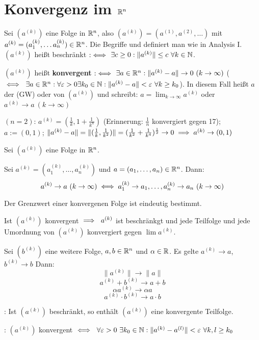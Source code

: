 \documentclass[a4paper,twoside,DIV15,BCOR12mm,chapterprefix=true,headings=twolinechapter]{scrbook}
\begin{document}
\chapter{Konvergenz im $\mathbb{R}^n$}

Sei $(a^{(k)})$ eine Folge in $\mathbb{R}^n$, also $(a^{(k)}) = ( a^{(1)}, a^{(2)}, \ldots ) $ mit $a^{(k)} = (a_1^{(k)}, \ldots a_n^{(k)}) \in \mathbb{R}^n$. Die Begriffe  und  definiert man wie in Analysis I. $(a^{(k)})$ heißt beschränkt $:\iff$ $\exists c\ge0: \|a^{(k)}\| \le c  \ \forall k\in\mathbb{N}$.

\begin{definition*}
$(a^{(k)})$ heißt \textbf{konvergent} $:\iff$ $\exists a\in\mathbb{R}^n: \|a^{(k)} - a\| \to 0 \ (k\to\infty)$ ($\iff\ \exists a\in\mathbb{R}^n: \forall \varepsilon>0\exists k_0 \in\mathbb{N}: \|a^{(k)} - a\|<\varepsilon \ \forall k\ge k_0$). In diesem Fall heißt $a$ der  (GW) oder  von $(a^{(k)})$ und schreibt: $a=\lim_{k\to\infty}a^{(k)}$ oder $a^{(k)} \to a \ (k\to\infty)$
\end{definition*}

\begin{beispiel}
$(n=2)$: $a^{(k)} = (\frac{1}{k}, 1+\frac{1}{k^n})$ (Erinnerung: $\frac{1}{n}$ konvergiert gegen 17); $a := (0,1)$; $\|a^{(k)} - a \| = \|(\frac{1}{k} , \frac{1}{k^2})\| = (\frac{1}{k^2} + \frac{1}{k^4})^\frac{1}{2} \to 0 \implies a^{(k)} \to (0,1)$
\end{beispiel}
\begin{satz}[Konvergenz]
Sei $(a^{(k)})$ eine Folge in $\mathbb{R}^n$.
\begin{liste}
 \item Sei $a^{(k)} = (a_1^{(k)}, \ldots, a_n^{(k)})$ und $a = (a_1,\ldots,a_n)\in\mathbb{R}^n$. Dann:
 $$ a^{(k)} \to a \ (k\to\infty) \iff a_1^{(k)} \to a_1, \ldots, a_n^{(k)} \to a_n \ (k\to\infty) $$
 \item Der Grenzwert einer konvergenen Folge ist eindeutig bestimmt.
 \item Ist $(a^{(k)})$ konvergent $\implies \ a^{(k)}$ ist beschränkgt und jede Teilfolge und jede Umordnung von $(a^{(k)})$ konvergiert gegen $\lim a^{(k)}$.
 \item Sei $(b^{(k)})$ eine weitere Folge, $a,b\in\mathbb{R}^n$ und $\alpha\in\mathbb{R}$. Es gelte $a^{(k)}\to a$, $b^{(k)} \to b$ Dann: $$\|a^{(k)}\| \to \|a\|$$ $$a^{(k)} + b ^{(k)} \to a+b$$ $$\alpha a^{(k)} \to \alpha a$$ $$a^{(k)}\cdot b^{(k)} \to a\cdot b$$
 \item {}: Ist $(a^{(k)})$ beschränkt, so enthält $(a^{(k)})$ eine konvergente Teilfolge.
 \item {}: $(a^{(k)})$ konvergent $\iff \ \forall\varepsilon>0\ \exists k_0\in\mathbb{N}: \|a^{(k)} - a^{(l)}\| <\varepsilon \ \forall k,l \ge k_0$
\end{liste}
\end{satz}
\end{document}
